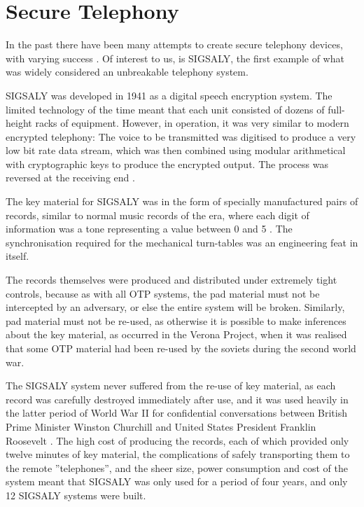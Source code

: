 
\section{Secure Telephony}
\label{chap2sec6}

	In the past there have been many attempts to create secure telephony devices, with varying success \citep{RN30}.
        Of interest to us, is SIGSALY, the first example of what was widely considered an unbreakable telephony system.
        
	SIGSALY was developed in 1941 as a digital speech encryption system.
        The limited technology of the time meant that each unit consisted of dozens of full-height racks of equipment.
        However, in operation, it was very similar to modern encrypted telephony:
        The voice to be transmitted was digitised to produce a very low bit rate data stream, which was then combined using modular arithmetical with cryptographic keys to produce the encrypted output. The process was reversed at the receiving end \citep{bennett1983secret,RN21}.

        The key material for SIGSALY was in the form of specially manufactured pairs of records, similar to normal music records of the era, where each digit of information was a tone representing a value between 0 and 5 \citep{bennett1983secret}.  The synchronisation required for the mechanical turn-tables was an engineering feat in itself.
        
        The records themselves were produced and distributed under extremely tight controls, because as with all OTP systems, the pad material must not be intercepted by an adversary, or else the entire system will be broken.
        Similarly, pad material must not be re-used, as otherwise it is possible to make inferences about the key material, as occurred in the Verona Project, when it was realised that some OTP material had been re-used by the soviets during the second world war\citep{cohen1997venona,mcgrew2002counter}.

        The SIGSALY system never suffered from the re-use of key material, as each record was carefully destroyed immediately after use,
        and it was used heavily in the latter period of World War II for confidential conversations between British Prime Minister Winston Churchill and United States President Franklin Roosevelt \citep{RN21}.
        The high cost of producing the records, each of which provided only twelve minutes of key material, the complications of safely transporting them to the remote ''telephones'', and the sheer size, power consumption and cost of the system meant that SIGSALY was only used for a period of four years, and only 12 SIGSALY systems were built\citep{RN21}.
    
